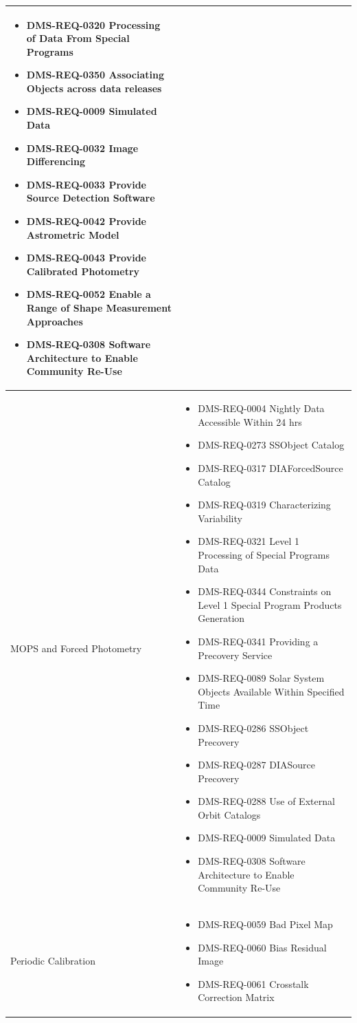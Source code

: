 \documentclass[DM,lsstdraft,toc]{lsstdoc}
\begin{document}
\begin{xtabular}{|p{0.1\textwidth}|p{0.85\textwidth}|}
\begin{itemize}
\item DMS-REQ-0320 Processing of Data From Special Programs
\item DMS-REQ-0350 Associating Objects across data releases
\item DMS-REQ-0009 Simulated Data
\item DMS-REQ-0032 Image Differencing
\item DMS-REQ-0033 Provide Source Detection Software
\item DMS-REQ-0042 Provide Astrometric Model
\item DMS-REQ-0043 Provide Calibrated Photometry
\item DMS-REQ-0052 Enable a Range of Shape Measurement Approaches
\item DMS-REQ-0308 Software Architecture to Enable Community Re-Use \end{itemize} \\ \hline
MOPS and Forced Photometry &
\begin{itemize} \item DMS-REQ-0004 Nightly Data Accessible Within 24 hrs
\item DMS-REQ-0273 SSObject Catalog
\item DMS-REQ-0317 DIAForcedSource Catalog
\item DMS-REQ-0319 Characterizing Variability
\item DMS-REQ-0321 Level 1 Processing of Special Programs Data
\item DMS-REQ-0344 Constraints on Level 1 Special Program Products Generation
\item DMS-REQ-0341 Providing a Precovery Service
\item DMS-REQ-0089 Solar System Objects Available Within Specified Time
\item DMS-REQ-0286 SSObject Precovery
\item DMS-REQ-0287 DIASource Precovery
\item DMS-REQ-0288 Use of External Orbit Catalogs
\item DMS-REQ-0009 Simulated Data
\item DMS-REQ-0308 Software Architecture to Enable Community Re-Use \end{itemize} \\ \hline
Periodic Calibration &
\begin{itemize} \item DMS-REQ-0059 Bad Pixel Map
\item DMS-REQ-0060 Bias Residual Image
\item DMS-REQ-0061 Crosstalk Correction Matrix

\end{itemize}
\end{xtabular}
\end{document}

